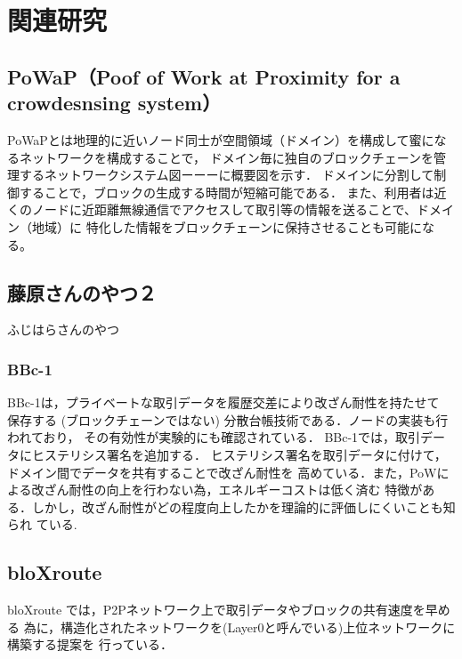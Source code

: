 \documentclass[a4paper,12pt]{jsarticle}
\begin{document}
\newpage
\section{関連研究}
      \subsection{PoWaP（Poof of Work at Proximity for a crowdesnsing system）}
PoWaPとは地理的に近いノード同士が空間領域（ドメイン）を構成して蜜になるネットワークを構成することで，
ドメイン毎に独自のブロックチェーンを管理するネットワークシステム図ーーーに概要図を示す．
ドメインに分割して制御することで，ブロックの生成する時間が短縮可能である．
また、利用者は近くのノードに近距離無線通信でアクセスして取引等の情報を送ることで、ドメイン（地域）に
特化した情報をブロックチェーンに保持させることも可能になる。



      \subsection{藤原さんのやつ２}
ふじはらさんのやつ

      \subsubsection{BBc-1}

BBc-1\cite{saito}は，プライベートな取引データを履歴交差により改ざん耐性を持たせて
保存する (ブロックチェーンではない) 分散台帳技術である．ノードの実装も行われており，
その有効性が実験的にも確認されている．
BBc-1では，取引データにヒステリシス署名を追加する．
ヒステリシス署名を取引データに付けて，ドメイン間でデータを共有することで改ざん耐性を
高めている．また，PoWによる改ざん耐性の向上を行わない為，エネルギーコストは低く済む
特徴がある．しかし，改ざん耐性がどの程度向上したかを理論的に評価しにくいことも知られ
ている. 

      \subsection{bloXroute}
bloXroute \cite{bloX} では，P2Pネットワーク上で取引データやブロックの共有速度を早める
為に，構造化されたネットワークを(Layer0と呼んでいる)上位ネットワークに構築する提案を
行っている．
\end{document}
